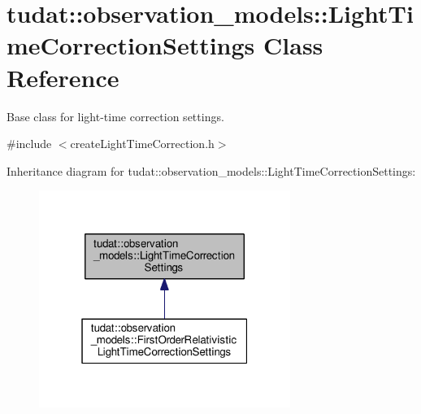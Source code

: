 \hypertarget{classtudat_1_1observation__models_1_1LightTimeCorrectionSettings}{}\section{tudat\+:\+:observation\+\_\+models\+:\+:Light\+Time\+Correction\+Settings Class Reference}
\label{classtudat_1_1observation__models_1_1LightTimeCorrectionSettings}


Base class for light-\/time correction settings.  




{\ttfamily \#include $<$create\+Light\+Time\+Correction.\+h$>$}



Inheritance diagram for tudat\+:\+:observation\+\_\+models\+:\+:Light\+Time\+Correction\+Settings\+:
\nopagebreak
\begin{figure}[H]
\begin{center}
\leavevmode
\includegraphics[width=232pt]{classtudat_1_1observation__models_1_1LightTimeCorrectionSettings__inherit__graph}
\end{center}
\end{figure}
